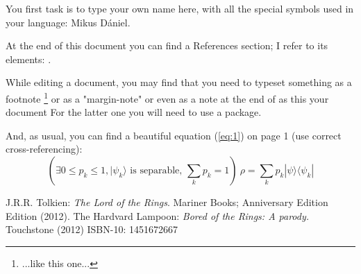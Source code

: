 \documentclass[12pt]{article}
\begin{document}
\par
You first task is to type your own name here, with all the special symbols used in your language: Mikus Dániel. \par
At the end of this document you can find a References section; I refer to its elements: \cite{Lotr, lmp}.  \par
While editing a document, you may find that you need to typeset something as a footnote \footnote{...like this one...} or as a "margin-note"  or even as a note at the end of as this your document  For the latter one you will need to use a package. \par
And, as usual, you can find a beautiful equation (\ref{eq:1}) on page 1 (use correct cross-referencing):
\begin{equation} \label{eq:1}
    \left( \exists 0 \leq p_k \leq 1, | \psi _k \rangle \text{~is separable,~} \sum_k p_k = 1 \right)~ \rho = \sum_k p_k | \psi \rangle \langle \psi _k |
\end{equation}


\begin{thebibliography}{9}
J.R.R. Tolkien: 
\textit{The Lord of the Rings}. Mariner Books; Anniversary Edition
Edition (2012).
The Hardvard Lampoon:
\textit{Bored of the Rings: A parody.} Touchstone 
(2012) ISBN-10: 1451672667
\end{thebibliography}
\printnotes*
\end{document}
